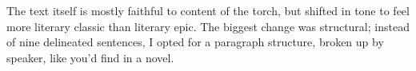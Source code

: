 \documentclass[fontsize=12pt,twoside=false,numbers=noenddot]{class/kaobook}
\newcommand{\tbf}[1]{\textbf{#1}}
\begin{document}
The text itself is mostly faithful to content of the torch, but shifted in tone to feel more literary classic than literary epic.  The biggest change was structural; instead of nine delineated sentences, I opted for a paragraph structure, broken up by speaker, like you'd find in a novel. %
\end{document}
